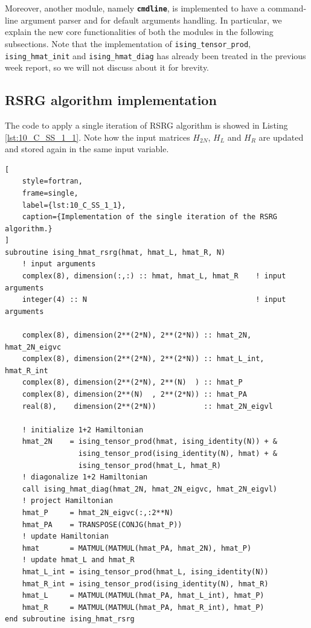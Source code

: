\documentclass[pra, onecolumn, notitlepage, floats, 11pt]{revtex4-1}
\newcommand{\codebold}[2][cobalt]{\texttt{\bfseries {\color{#1}#2}}}
\newcommand{\code}[2][black]{\color{#1}\texttt{#2}}
\begin{document}
Moreover, another module, namely \codebold{cmdline}, is implemented to have a command-line argument parser and for default arguments handling. In particular, we explain the new core functionalities of both the modules in the following subsections. Note that the implementation of \code{ising\_tensor\_prod}, \code{ising\_hmat\_init} and \code{ising\_hmat\_diag} has already been treated in the previous week report, so we will not discuss about it for brevity.



\subsection{RSRG algorithm implementation}
The code to apply a single iteration of RSRG algorithm is showed in Listing \ref{lst:10_C_SS_1_1}. Note how the input matrices \( H_{2N} \), \( H_{L} \) and \( H_{R} \) are updated and stored again in the same input variable.

\begin{lstlisting}[
    style=fortran,
    frame=single,
    label={lst:10_C_SS_1_1},
    caption={Implementation of the single iteration of the RSRG algorithm.}
]
subroutine ising_hmat_rsrg(hmat, hmat_L, hmat_R, N)
    ! input arguments
    complex(8), dimension(:,:) :: hmat, hmat_L, hmat_R    ! input arguments
    integer(4) :: N                                       ! input arguments

    complex(8), dimension(2**(2*N), 2**(2*N)) :: hmat_2N, hmat_2N_eigvc
    complex(8), dimension(2**(2*N), 2**(2*N)) :: hmat_L_int, hmat_R_int
    complex(8), dimension(2**(2*N), 2**(N)  ) :: hmat_P
    complex(8), dimension(2**(N)  , 2**(2*N)) :: hmat_PA
    real(8),    dimension(2**(2*N))           :: hmat_2N_eigvl

    ! initialize 1+2 Hamiltonian
    hmat_2N    = ising_tensor_prod(hmat, ising_identity(N)) + &
                 ising_tensor_prod(ising_identity(N), hmat) + &
                 ising_tensor_prod(hmat_L, hmat_R)
    ! diagonalize 1+2 Hamiltonian
    call ising_hmat_diag(hmat_2N, hmat_2N_eigvc, hmat_2N_eigvl)
    ! project Hamiltonian
    hmat_P     = hmat_2N_eigvc(:,:2**N)
    hmat_PA    = TRANSPOSE(CONJG(hmat_P))
    ! update Hamiltonian
    hmat       = MATMUL(MATMUL(hmat_PA, hmat_2N), hmat_P)
    ! update hmat_L and hmat_R
    hmat_L_int = ising_tensor_prod(hmat_L, ising_identity(N))
    hmat_R_int = ising_tensor_prod(ising_identity(N), hmat_R)
    hmat_L     = MATMUL(MATMUL(hmat_PA, hmat_L_int), hmat_P)
    hmat_R     = MATMUL(MATMUL(hmat_PA, hmat_R_int), hmat_P)
end subroutine ising_hmat_rsrg
\end{lstlisting}
\end{document}
